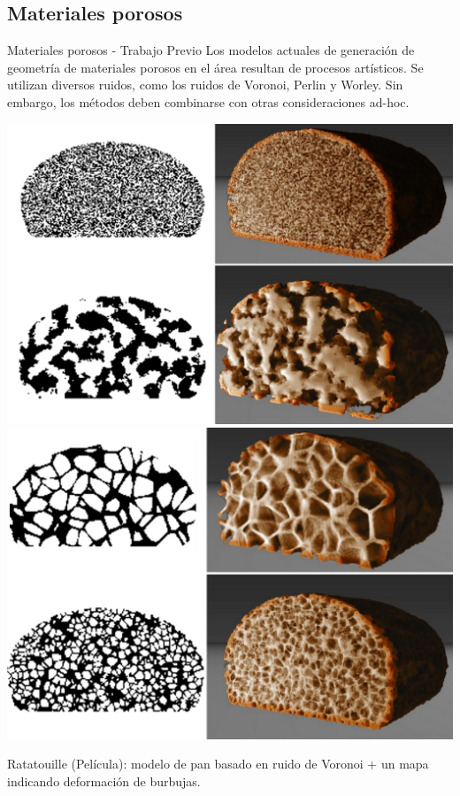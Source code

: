 \documentclass[spanish]{beamer}
\begin{document}
\subsection{Materiales porosos}
\begin{frame}{Materiales porosos - Trabajo Previo}
Los modelos actuales de generación de geometría de materiales porosos en el área resultan de procesos artísticos.
Se utilizan diversos ruidos, como los ruidos de Voronoi, Perlin y Worley. Sin embargo, los métodos deben combinarse con otras consideraciones ad-hoc.

\includegraphics[scale = 0.2]{../figures/Fig8}
\includegraphics[scale = 0.2]{../figures/Fig9CAVW}

Ratatouille (Película): modelo de pan basado en ruido de Voronoi + un mapa indicando deformación de burbujas.
\end{frame}
\end{document}
